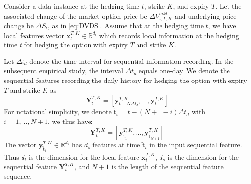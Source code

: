 \documentclass[letterpaper,12pt,titlepage,oneside,final]{book}
\numberwithin{equation}{section}
\theoremstyle{definition}
\newcommand{\vx}{\mathbf{x}}
\newcommand{\vy}{\mathbf{y}}
\newcommand{\DT}{\Delta t}
\newcommand{\Real}{\mathbb{R}}
\newcommand{\nt}{\breve{\text{t}}}
\begin{document}
 Consider a data instance at the hedging time $t$, strike $K$, and expiry $T$. Let the associated change of the market option price  be $\Delta V^{mkt}_{t,T,K}$ and underlying price change be $\Delta S_t$, as in \eqref{eq:DVDS}.
Assume that at the hedging time $t$, we have local features vector $\vx^{T,K}_{t} \in \Real^{d_l}$ which records local information at the hedging time $t$ for hedging the option with expiry $T$ and strike $K$.

Let $\DT_{d}$ denote the time interval for sequential information recording. In  the subsequent empirical study, the interval $\DT_{d}$ equals one-day.  We denote the sequential features recording the daily history for hedging the option with expiry $T$ and strike $K$ as
\[
\mathbf{Y}_{t}^{T,K}=\left[\vy^{T,K}_{t-N \DT_{d}},\dots,\vy^{T,K}_{t}\right]
\]
For notational simplicity, we denote $\nt_i=t-(N+1-i)\DT_d$ with $i=1, \dots,N+1$, we thus have:
\[
\mathbf{Y}_{t}^{T,K}=\left[\vy^{T,K}_{\nt_{1}},\dots,\vy^{T,K}_{\nt_{N+1}}\right]
\]
The vector $\vy^{T,K}_{\nt_{i}} \in \Real^{d_s}$ has  $d_s$ features at time $\nt_{i}$ in the input sequential feature.
Thus $d_l$ is the dimension for the local feature $\vx_{t}^{T,K}$, $d_s$ is the dimension for the sequential feature $\mathbf{Y}_{t}^{T,K}$, and
$N+1$ is the length of the sequential feature sequence.
\end{document}
